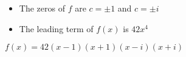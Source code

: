 {\begin{itemize}

\item The zeros of $f$ are $c=\pm 1$ and $c = \pm i$
\item The leading term of $f(x)$ is $42x^4$

\end{itemize}}
{$f(x) = 42(x-1)(x+1)(x-i)(x+i)$}
